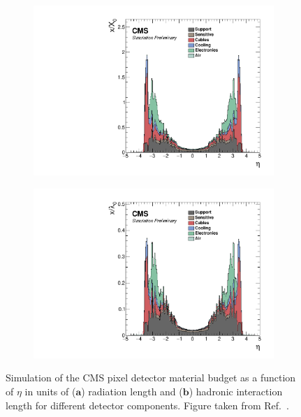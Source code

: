 \begin{figure}[h]
    \centering
    \begin{subfigure}[b]{0.49\textwidth}
        \centering
        \includegraphics[width=\textwidth]{Figures/Chapter3/Material_Budget1.pdf}
        \caption{}
    \end{subfigure}
    \begin{subfigure}[b]{0.49\textwidth}
        \centering
        \includegraphics[width=\textwidth]{Figures/Chapter3/Material_Budget2.pdf}
        \caption{}
    \end{subfigure}
\caption[Simulation of the CMS pixel detector material budget]{Simulation of the CMS pixel detector material budget as a function of $\eta$ in units of ($\textbf{a}$) radiation length and ($\textbf{b}$) hadronic interaction length for different detector components. Figure taken from Ref.~\cite{TrackerMaterialBudget_Pixel}.}
\label{Figure:Chapter3_Tracker_MaterialBudget}
\end{figure}

